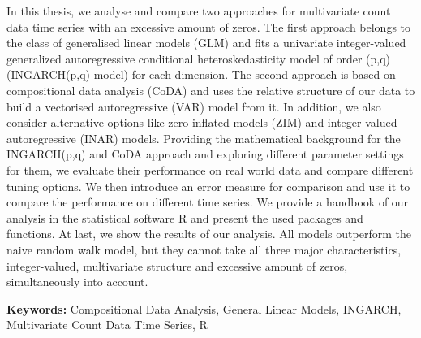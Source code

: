 In this thesis, we analyse and compare two approaches for multivariate count data time series with an excessive amount of zeros. The first approach belongs to the class of generalised linear models (GLM) and fits a univariate integer-valued generalized autoregressive conditional heteroskedasticity model of order (p,q) (INGARCH(p,q) model) for each dimension. The second approach is based on compositional data analysis (CoDA) and uses the relative structure of our data to build a vectorised autoregressive (VAR) model from it. In addition, we also consider alternative options like zero-inflated models (ZIM) and integer-valued autoregressive (INAR) models. Providing the mathematical background for the INGARCH(p,q) and CoDA approach and exploring different parameter settings for them, we evaluate their performance on real world data and compare different tuning options. We then introduce an error measure for comparison and use it to compare the performance on different time series. We provide a handbook of our analysis in the statistical software R and present the used packages and functions. At last, we show the results of our analysis. All models outperform the naive random walk model, but they cannot take all three major characteristics, integer-valued, multivariate structure and excessive amount of zeros, simultaneously into account.  \newline



\textbf{Keywords:} Compositional Data Analysis, General Linear Models, INGARCH, Multivariate Count Data Time Series, R